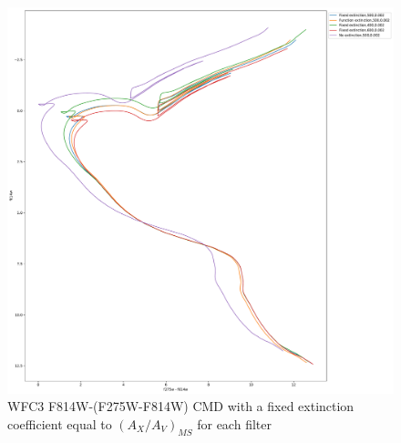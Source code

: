 \documentclass[12pt, a4paper]{report}
\begin{document}
\begin{figure}[h]
\begin{center}
\includegraphics[scale=0.3]{../basti_isochrones_10_13Gyr/Extinction_T5k_FeH0fix_func_f814w_f275wmf814w_500_400_600_Myr_FeH_0p002_ref_noext_Av_1p0.pdf}
\caption{WFC3 F814W-(F275W-F814W) CMD with a fixed extinction coefficient equal to $(A_{X}/A_{V})_{MS}$ for each filter}
\label{wfc3_isoc2_T5k}
\end{center}
\end{figure}
\end{document}
